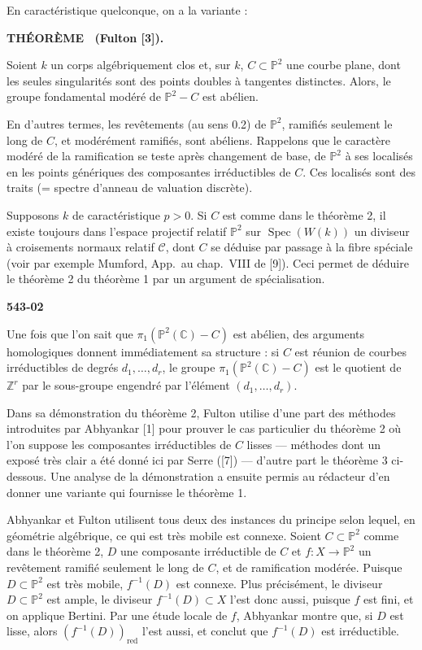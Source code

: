\documentclass[12pt,a4paper]{article}
\newcounter{mainthm}
\newenvironment{maintheorem}[1][]{%
  \refstepcounter{mainthm}%
  \par\medskip\noindent\textbf{THÉORÈME \themainthm#1.}~\ignorespaces
}{\par\medskip}
\DeclareMathOperator{\Spec}{Spec}
\begin{document}
En caractéristique quelconque, on a la variante :

\begin{maintheorem}[~(Fulton {[3]})]
Soient $k$ un corps algébriquement clos et, sur $k$, $C \subset \mathbb{P}^2$ une courbe plane, dont les seules singularités sont des points doubles à tangentes distinctes. Alors, le groupe fondamental modéré de $\mathbb{P}^2 - C$ est abélien.
\end{maintheorem}

En d'autres termes, les revêtements (au sens 0.2) de $\mathbb{P}^2$, ramifiés seulement le long de $C$, et modérément ramifiés, sont abéliens. Rappelons que le caractère modéré de la ramification se teste après changement de base, de $\mathbb{P}^2$ à ses localisés en les points génériques des composantes irréductibles de $C$. Ces localisés sont des traits (= spectre d'anneau de valuation discrète).

Supposons $k$ de caractéristique $p > 0$. Si $C$ est comme dans le théorème 2, il existe toujours dans l'espace projectif relatif $\mathbb{P}^2$ sur $\Spec(W(k))$ un diviseur à croisements normaux relatif $\mathcal{C}$, dont $C$ se déduise par passage à la fibre spéciale (voir par exemple Mumford, App.\ au chap.\ VIII de [9]). Ceci permet de déduire le théorème 2 du théorème 1 par un argument de spécialisation.

\newpage
\begin{flushright}
\textbf{543-02}
\end{flushright}

Une fois que l'on sait que $\pi_1(\mathbb{P}^2(\mathbb{C}) - C)$ est abélien, des arguments homologiques donnent immédiatement sa structure : si $C$ est réunion de courbes irréductibles de degrés $d_1, \ldots, d_r$, le groupe $\pi_1(\mathbb{P}^2(\mathbb{C}) - C)$ est le quotient de $\mathbb{Z}^r$ par le sous-groupe engendré par l'élément $(d_1, \ldots, d_r)$.

Dans sa démonstration du théorème 2, Fulton utilise d'une part des méthodes introduites par Abhyankar [1] pour prouver le cas particulier du théorème 2 où l'on suppose les composantes irréductibles de $C$ lisses --- méthodes dont un exposé très clair a été donné ici par Serre ([7]) --- d'autre part le théorème 3 ci-dessous. Une analyse de la démonstration a ensuite permis au rédacteur d'en donner une variante qui fournisse le théorème 1.

Abhyankar et Fulton utilisent tous deux des instances du principe selon lequel, en géométrie algébrique, ce qui est très mobile est connexe. Soient $C \subset \mathbb{P}^2$ comme dans le théorème 2, $D$ une composante irréductible de $C$ et $f : X \to \mathbb{P}^2$ un revêtement ramifié seulement le long de $C$, et de ramification modérée. Puisque $D \subset \mathbb{P}^2$ est très mobile, $f^{-1}(D)$ est connexe. Plus précisément, le diviseur $D \subset \mathbb{P}^2$ est ample, le diviseur $f^{-1}(D) \subset X$ l'est donc aussi, puisque $f$ est fini, et on applique Bertini. Par une étude locale de $f$, Abhyankar montre que, si $D$ est lisse, alors $(f^{-1}(D))_{\mathrm{red}}$ l'est aussi, et conclut que $f^{-1}(D)$ est irréductible.
\end{document}
